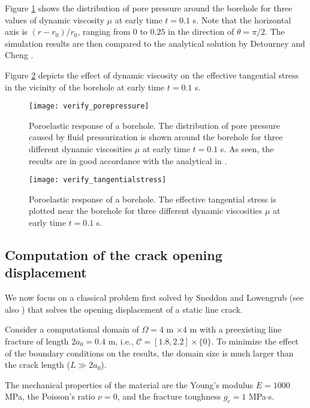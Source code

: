 Figure \ref{Fig:Borehole_porepressure} shows the distribution
of pore pressure around the borehole for three values of dynamic viscosity $\mu$ at early time $t=0.1$ s. Note that the horizontal axis is $(r-r_0)/r_0$, ranging from $0$ to $0.25$ in the direction of $\theta= \pi/2$. The simulation results are then compared to the analytical solution by Detourney and Cheng \cite{detournay1988poroelastic}.

Figure \ref{Fig:Borehole_tangential_stress} depicts the effect of dynamic viscosity on the effective tangential stress in the vicinity of the borehole at early time $t=0.1$ s.%

\begin{figure}[htbp]
    \centering
    \texttt{[image: verify\_porepressure]}
    \caption{Poroelastic response of a borehole. The distribution of pore pressure caused by fluid pressurization is shown around the borehole for three different dynamic viscosities $\mu$ at early time $t= 0.1$ s. As seen, the results are in good accordance with the analytical in \cite{detournay1988poroelastic}.}
    \label{Fig:Borehole_porepressure}
\end{figure}

\begin{figure}[htbp]
    \centering
    \texttt{[image: verify\_tangentialstress]}
    \caption{Poroelastic response of a borehole. The effective tangential stress is plotted near the borehole for three different dynamic viscosities $\mu$ at early time $t=0.1$ s.}
    \label{Fig:Borehole_tangential_stress}
\end{figure}

\subsection{Computation of the crack opening displacement} \label{sec: AP-verification-opening}
We now focus on a classical problem first solved by Sneddon and Lowengrub \cite{SneddonLowengrub69} (see also \cite{bourdin2012variational}) that solves the opening displacement of a static line crack.

Consider a computational domain of $\Omega=4$ m $\times 4$ m with a preexisting line fracture of length $2a_0=0.4$ m, i.e., $\mathcal{C}=[1.8, 2.2]\times\{0\}$. To minimize the effect of the boundary conditions on the results, the domain size is much larger than the crack length ($L\gg 2a_0$).

The mechanical properties of the material are the Young's modulus $E=1000$ MPa, the Poisson's ratio $\nu=0$, and the fracture toughness $g_c=1$ MPa$\cdot$s.

